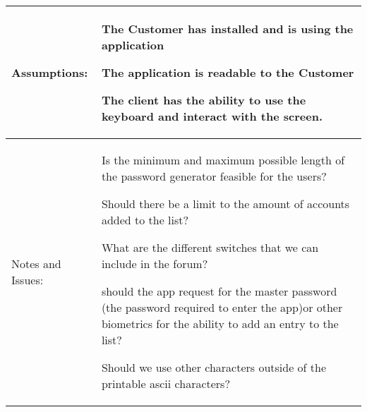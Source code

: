 \documentclass[stu]{apa7}
\newcommand{\nextitem}{\par\hspace*{\labelsep}\textbullet\hspace*{\labelsep}}
\begin{document}
{\begin{xltabular}{\textwidth}{|l|X|}
   Assumptions: & \nextitem The Customer has installed and is using the application
     \nextitem The application is readable to the Customer
     \nextitem The client has the ability to use the keyboard and interact with the screen. \\ \hline

   Notes and Issues: & \nextitem Is the minimum and maximum possible length of the password generator feasible for the users?
     \nextitem Should there be a limit to the amount of accounts added to the list?
     \nextitem What are the different switches that we can include in the forum?
     \nextitem should the app request for the master password (the password required to enter the app)or other biometrics for the ability to add an entry to the list?
     \nextitem Should we use other characters outside of the printable ascii characters? \\ \hline
\end{xltabular}}
\end{document}
